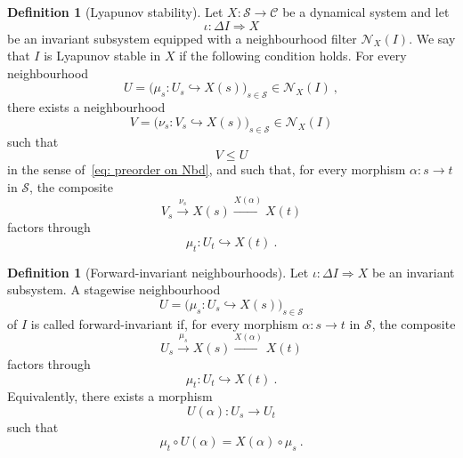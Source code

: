 \documentclass[a4paper,reqno,oneside]{amsart}
\theoremstyle{definition}
\newtheorem{definition}[theorem]{Definition}
\theoremstyle{remark}
\numberwithin{equation}{section}
\begin{document}
	\begin{definition}[Lyapunov stability]\label{def: Lyapunov stable}
		Let $X\colon\mathcal S\to\mathcal C$ be a dynamical system and let
		\begin{equation}
			\iota\colon \Delta I\Longrightarrow X
		\end{equation}
		be an invariant subsystem equipped with a neighbourhood filter
		$\mathcal N_X(I)$. We say that $I$ is Lyapunov stable in $X$ if the following condition holds.
		For every neighbourhood
		\begin{equation}
			U =
			\bigl(\mu_s\colon U_s\hookrightarrow X(s)\bigr)_{s\in\mathcal S}
			\in \mathcal N_X(I) \ ,
		\end{equation}
		there exists a neighbourhood
		\begin{equation}
			V =
			\bigl(\nu_s\colon V_s\hookrightarrow X(s)\bigr)_{s\in\mathcal S}
			\in \mathcal N_X(I)
		\end{equation}
		such that
		\begin{equation}
			V\leq U
		\end{equation}
		in the sense of~\eqref{eq: preorder on Nbd}, and such that, for every
		morphism $\alpha\colon s\to t$ in $\mathcal S$, the composite
		\begin{equation}
			V_s\xrightarrow{\nu_s}X(s)\xrightarrow{X(\alpha)}X(t)
		\end{equation}
		factors through
		\begin{equation}
			\mu_t\colon U_t\hookrightarrow X(t) \ .
		\end{equation}
	\end{definition}
	
	
	
	
	\begin{definition}[Forward-invariant neighbourhoods]\label{def: forward invariant neighbourhoods}
		Let $\iota\colon \Delta I\Rightarrow X$ be an invariant subsystem. A stagewise neighbourhood
		\begin{equation}
			U=\big(\mu_s\colon U_s\hookrightarrow X(s)\big)_{s\in\mathcal S}
		\end{equation}
		of $I$ is called forward-invariant if, for every morphism $\alpha\colon s\to t$ in $\mathcal S$, the composite
		\begin{equation}
			U_s\xrightarrow{\mu_s}X(s)\xrightarrow{X(\alpha)}X(t)
		\end{equation}
		factors through
		\begin{equation}
			\mu_t\colon U_t\hookrightarrow X(t) \ .
		\end{equation}
		Equivalently, there exists a morphism
		\begin{equation}
			U(\alpha)\colon U_s\longrightarrow U_t
		\end{equation}
		such that
		\begin{equation}
			\mu_t\circ U(\alpha)=X(\alpha)\circ \mu_s \ .
		\end{equation}
	\end{definition}
	
\end{document}
